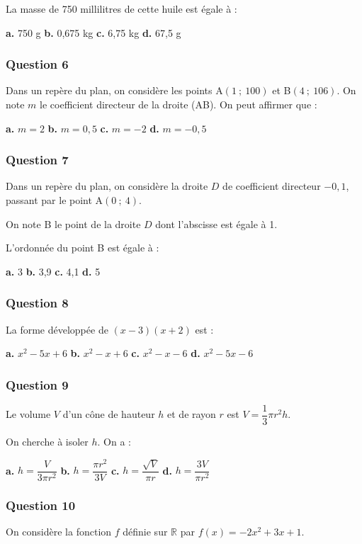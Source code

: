 \documentclass[10pt]{article}
\begin{document}
La masse de 750 millilitres de cette huile est égale à :

\textbf{a.} 750 g \hfill \textbf{b.} 0,675 kg \hfill \textbf{c.} 6,75 kg \hfill \textbf{d.} 67,5 g

\subsubsection*{Question 6}
Dans un repère du plan, on considère les points A$(1~;~100)$ et B$(4~;~106)$. On note $m$ le coefficient directeur de la droite (AB). On peut affirmer que :

\textbf{a.} $m = 2$ \hfill \textbf{b.} $m = 0,5$ \hfill \textbf{c.} $m = -2$ \hfill \textbf{d.} $m = -0,5$

\subsubsection*{Question 7}
Dans un repère du plan, on considère la droite $D$ de coefficient directeur $-0,1$, passant par le point A$(0~;~4)$.

On note B le point de la droite $D$ dont l'abscisse est égale à 1.

L'ordonnée du point B est égale à :

\textbf{a.} 3 \hfill \textbf{b.} 3,9 \hfill \textbf{c.} 4,1 \hfill \textbf{d.} 5

\subsubsection*{Question 8}
La forme développée de $(x - 3)(x + 2)$ est :

\textbf{a.} $x^2 - 5x + 6$ \hfill \textbf{b.} $x^2 - x + 6$ \hfill \textbf{c.} $x^2 - x - 6$ \hfill \textbf{d.} $x^2 - 5x - 6$

\subsubsection*{Question 9}
Le volume $V$ d'un cône de hauteur $h$ et de rayon $r$ est $V = \dfrac{1}{3} \pi r^2 h$.

On cherche à isoler $h$. On a :

\textbf{a.} $h = \dfrac{V}{3 \pi r^2}$ \hfill \textbf{b.} $h = \dfrac{\pi r^2}{3V}$ \hfill \textbf{c.} $h = \dfrac{\sqrt{V}}{\pi r}$ \hfill \textbf{d.} $h = \dfrac{3V}{\pi r^2}$

\subsubsection*{Question 10}
On considère la fonction $f$ définie sur $\mathbb{R}$ par $f(x) = -2x^2 + 3x + 1$.
\end{document}
